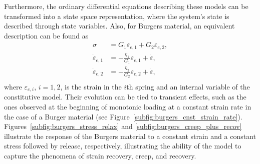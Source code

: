 Furthermore, the ordinary differential equations describing these models can be transformed into a state space representation, where the system's state is described through state variables.
Also, for Burgers material, an equivalent description can be found as
\begin{align}
\label{eq:state_var_desc_burgers}
	\sigma &= G_1\varepsilon_{e,1} + G_2\varepsilon_{e,2},\\
	\dot \varepsilon_{e,1} &= -\frac{\eta_1}{G_1}\varepsilon_{e,1} + \dot \varepsilon,\\
	\dot \varepsilon_{e,2} &= -\frac{\eta_2}{G_2}\varepsilon_{e,2} + \dot \varepsilon,\\
\end{align}
where $\varepsilon_{e, i}$, $i=1,2$, is the strain in the $i$th spring and an internal variable of the constitutive model.
Their evolution can be tied to transient effects, such as the ones observed at the beginning of monotonic loading at a constant strain rate in the case of a Burger material (see Figure~\ref{subfig:burgers_cnst_strain_rate}).
Figures~\ref{subfig:burgers_stress_relax} and \ref{subfig:burgers_creep_plus_recov} illustrate the response of the Burgers material to a constant strain and a constant stress followed by release, respectively, illustrating the ability of the model to capture the phenomena of strain recovery, creep, and recovery.
